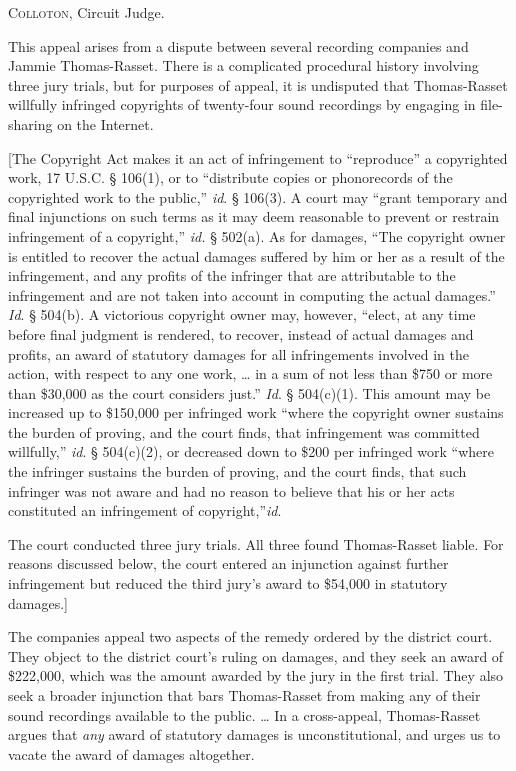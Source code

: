 
\opinion \textsc{Colloton}, Circuit Judge.

This appeal arises from a dispute between several recording companies and Jammie
Thomas-Rasset. There is a complicated procedural history involving three jury
trials, but for purposes of appeal, it is undisputed that Thomas-Rasset
willfully infringed copyrights of twenty-four sound recordings by engaging in
file-sharing on the Internet. 

[The Copyright Act makes it an act of infringement to ``reproduce'' a
copyrighted work, 17 U.S.C. {\S} 106(1), or to ``distribute copies or
phonorecords of the copyrighted work to the public,'' \textit{id}. {\S} 106(3).
A court may ``grant temporary and final injunctions on such terms as it may
deem reasonable to prevent or restrain infringement of a copyright,''
\textit{id.} {\S} 502(a). As for damages, ``The copyright owner is entitled to
recover the actual damages suffered by him or her as a result of the
infringement, and any profits of the infringer that are attributable to the
infringement and are not taken into account in computing the actual damages.''
\textit{Id}. {\S} 504(b). A victorious copyright owner may, however, ``elect,
at any time before final judgment is rendered, to recover, instead of actual
damages and profits, an award of statutory damages for all infringements
involved in the action, with respect to any one work, {\dots} in a sum of not
less than \$750 or more than \$30,000 as the court considers just.''
\textit{Id}. {\S} 504(c)(1). This amount may be increased up to \$150,000 per
infringed work ``where the copyright owner sustains the burden of proving, and
the court finds, that infringement was committed willfully,'' \textit{id}. {\S}
504(c)(2), or decreased down to \$200 per infringed work ``where the infringer
sustains the burden of proving, and the court finds, that such infringer was
not aware and had no reason to believe that his or her acts constituted an
infringement of copyright,''\textit{id}.

The court conducted three jury trials. All three found Thomas-Rasset liable. For
reasons discussed below, the court entered an injunction against further
infringement but reduced the third jury's award to \$54,000 in statutory
damages.]

The companies appeal two aspects of the remedy ordered by the district court.
They object to the district court's ruling on damages, and they seek an award
of \$222,000, which was the amount awarded by the jury in the first trial. They
also seek a broader injunction that bars Thomas-Rasset from making any of their
sound recordings available to the public. {\dots} In a cross-appeal,
Thomas-Rasset argues that \textit{any} award of statutory damages is
unconstitutional, and urges us to vacate the award of damages altogether.


